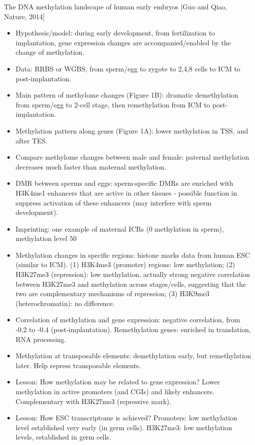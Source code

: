 \documentclass{report}
\begin{document}
The DNA methylation landscape of human early embryos [Guo and Qiao, Nature, 2014]
\begin{itemize}
	
	\item Hypothesis/model: during early development, from fertilization to implantation, gene expression changes are accompanied/enabled by the change of methylation. 
	
	\item Data: RRBS or WGBS, from sperm/egg to zygote to 2,4,8 cells to ICM to post-implantation. 
	
	\item Main pattern of methylome changes (Figure 1B): dramatic demethylation from sperm/egg to 2-cell stage, then remethylation from ICM to post-implantation.
	
	\item Methylation pattern along genes (Figure 1A): lower methylation in TSS, and after TES.
	
	\item Compare methylome changes between male and female: paternal methylation decreases much faster than maternal methylation.  
	
	\item DMR between sperms and eggs: sperm-specific DMRs are enriched with H3K4me1 enhancers that are active in other tissues - possible function in suppress activation of these enhancers (may interfere with sperm development). 
	
	\item Imprinting: one example of maternal ICRs (0 methylation in sperm), methylation level 50%
	
	\item Methylation changes in specific regions: histone marks data from human ESC (similar to ICM). (1) H3K4me3 (promoter) regions: low methylation; (2) H3K27me3 (repression): low methylation, actually strong negative correlation between H3K27me3 and methylation across stages/cells, suggesting that the two are complementary mechanisms of repression; (3) H3K9me3 (heterochromatin): no difference. 
	
	\item Correlation of methylation and gene expression: negative correlation, from -0.2 to -0.4 (post-implantation). Remethylation genes: enriched in translation, RNA processing. 
	
	\item Methylation at transposable elements: demethylation early, but remethylation later. Help repress transposable elements. 
	
	\item Lesson: How methylation may be related to gene expression? Lower methylation in active promoters (and CGIs) and likely enhancers. Complementary with H3K27me3 (repressive mark). 
	
	\item Lesson: How ESC transcriptome is achieved? Promoters: low methylation level established very early (in germ cells). H3K27me3: low methylation levels, established in germ cells. 
\end{itemize}
\end{document}
